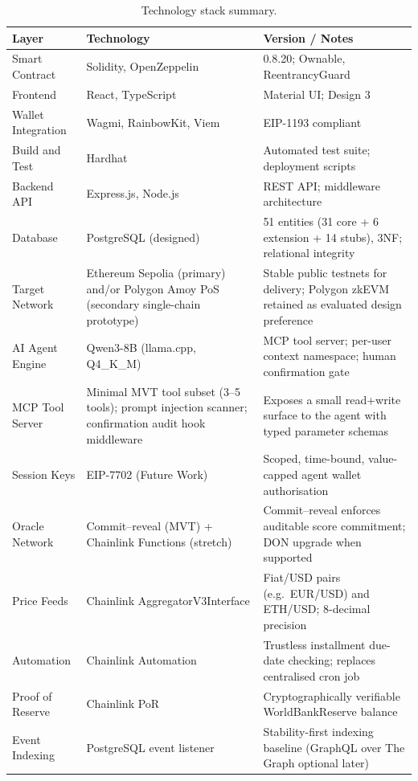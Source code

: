 \documentclass[12pt,a4paper]{article}
\newcommand{\tableheadcolor}{\rowcolor{TableHeadBg}}
\begin{document}
\begin{table}[H]
\centering
\caption[Technology stack summary]{Technology stack summary.}
\label{tab:tech-stack}
\begin{tabular}{p{3cm}p{4cm}p{6.5cm}}
\toprule
\tableheadcolor
\textbf{Layer} & \textbf{Technology} & \textbf{Version / Notes} \\
\midrule
Smart Contract & Solidity, OpenZeppelin & 0.8.20; Ownable, ReentrancyGuard \\
Frontend & React, TypeScript & Material UI; Design 3 \\
Wallet Integration & Wagmi, RainbowKit, Viem & EIP-1193 compliant \\
Build and Test & Hardhat & Automated test suite; deployment scripts \\
Backend API & Express.js, Node.js & REST API; middleware architecture \\
Database & PostgreSQL (designed) & 51 entities (31 core + 6 extension + 14 stubs), 3NF; relational integrity \\
Target Network & Ethereum Sepolia (primary) and/or Polygon Amoy PoS (secondary single-chain prototype) & Stable public testnets for delivery; Polygon zkEVM retained as evaluated design preference \\
AI Agent Engine & Qwen3-8B (llama.cpp, Q4\_K\_M) & MCP tool server; per-user context namespace; human confirmation gate \\
MCP Tool Server & Minimal MVT tool subset (3--5 tools); prompt injection scanner; confirmation audit hook middleware & Exposes a small read+write surface to the agent with typed parameter schemas \\
Session Keys & EIP-7702 (Future Work) & Scoped, time-bound, value-capped agent wallet authorisation \\
Oracle Network & Commit--reveal (MVT) + Chainlink Functions (stretch) & Commit--reveal enforces auditable score commitment; DON upgrade when supported \\
Price Feeds & Chainlink AggregatorV3Interface & Fiat/USD pairs (e.g.\ EUR/USD) and ETH/USD; 8-decimal precision \\
Automation & Chainlink Automation & Trustless installment due-date checking; replaces centralised cron job \\
Proof of Reserve & Chainlink PoR & Cryptographically verifiable WorldBankReserve balance \\
Event Indexing & PostgreSQL event listener & Stability-first indexing baseline (GraphQL over The Graph optional later) \\
\bottomrule
\end{tabular}
\end{table}
\end{document}
